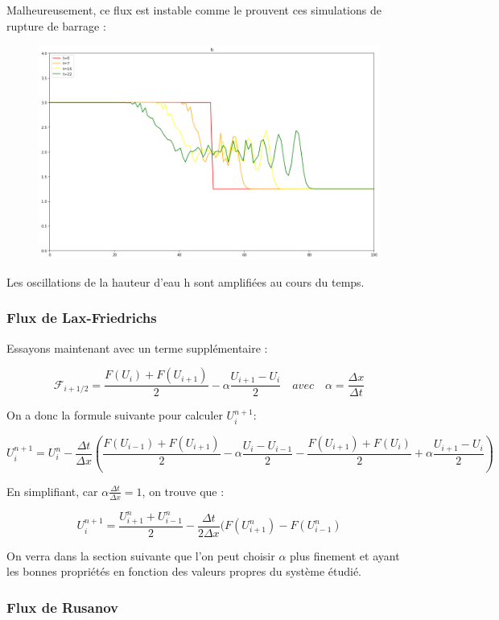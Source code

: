 \documentclass[
11pt, %
francais, %
singlespacing, %
headsepline, %
]{MastersDoctoralThesis} %
\theoremstyle{definition}
\begin{document}
Malheureusement, ce flux est instable comme le prouvent ces simulations de rupture de barrage :

\begin{figure}
\centering
\includegraphics[scale = .7]{"MauvaisSchema.png"}
\end{figure}

Les oscillations de la hauteur d'eau h sont amplifiées au cours du temps.

\subsubsection{Flux de Lax-Friedrichs}

Essayons maintenant avec un terme supplémentaire :

$$ \mathcal{F}_{i+1/2} = \frac{F(U_i) + F(U_{i+1})}{2} - \alpha \frac{U_{i+1} - U_i}{2} \quad avec \quad \alpha = \frac{\Delta x}{\Delta t}$$

On a donc la formule suivante pour calculer $U_i ^{n+1}$:

$$ U_i ^{n+1} = U_i ^{n}  - \frac{\Delta t}{\Delta x} ( \frac{F(U_{i-1}) + F(U_{i+1})}{2} - \alpha \frac{U_i - U_{i-1}}{2} - \frac{F(U_{i+1}) + F(U_i)}{2} + \alpha \frac{U_{i+1} - U_i}{2} ) $$

En simplifiant, car $ \alpha \frac{\Delta t}{\Delta x} = 1 $, on trouve que :

$$ U_i ^{n+1} = \frac{U_{i+1} ^{n} + U_{i-1} ^{n}}{2}  - \frac{\Delta t}{2 \Delta x} ( F(U_{i+1} ^n ) - F(U_{i-1} ^n ) $$

On verra dans la section suivante que l'on peut choisir $\alpha$ plus finement et ayant les bonnes propriétés en fonction des valeurs propres du système étudié.

\subsubsection{Flux de Rusanov}
\end{document}
